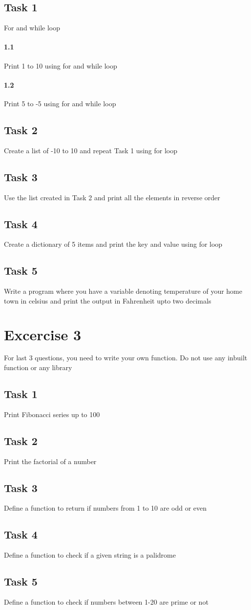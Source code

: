 \documentclass{article}
\begin{document}
    \subsection*{Task 1} For and while loop
    \paragraph{1.1}
    Print 1 to 10 using for and while loop
    \paragraph{1.2}
    Print 5 to -5 using for and while loop
    \subsection*{Task 2} Create a list of -10 to 10 and repeat Task 1 using for loop
    \subsection*{Task 3} Use the list created in Task 2 and print all the elements in reverse order
    \subsection*{Task 4} Create a dictionary of 5 items and print the key and value using for loop
    \subsection*{Task 5} 
    Write a program where you have a variable denoting temperature of your home town in celsius and print the output in Fahrenheit upto two decimals
    \\
    \section*{Excercise 3}
    For last 3 questions, you need to write your own function. Do not use any inbuilt function or any library
    \subsection*{Task 1} Print Fibonacci series up to 100
    \subsection*{Task 2} Print the factorial of a number
    \subsection*{Task 3} Define a function to return if numbers from 1 to 10 are odd or even
    \subsection*{Task 4} Define a function to check if a given string is a palidrome
    \subsection*{Task 5} Define a function to check if numbers between 1-20 are prime or not
    
    
\end{document}
